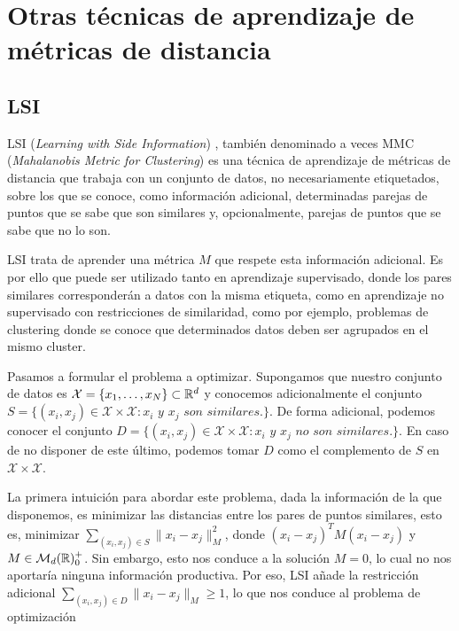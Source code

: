 \section{Otras técnicas de aprendizaje de métricas de distancia}

\subsection{LSI} \label{lsi}

LSI (\emph{Learning with Side Information}) \cite{lsi}, también denominado a veces MMC (\emph{Mahalanobis Metric for Clustering}) es una técnica de aprendizaje de métricas de distancia que trabaja con un conjunto de datos, no necesariamente etiquetados, sobre los que se conoce, como información adicional, determinadas parejas de puntos que se sabe que son similares y, opcionalmente, parejas de puntos que se sabe que no lo son.

LSI trata de aprender una métrica $M$ que respete esta información adicional. Es por ello que puede ser utilizado tanto en aprendizaje supervisado, donde los pares similares corresponderán a datos con la misma etiqueta, como en aprendizaje no supervisado con restricciones de similaridad, como por ejemplo, problemas de clustering donde se conoce que determinados datos deben ser agrupados en el mismo cluster.

Pasamos a formular el problema a optimizar. Supongamos que nuestro conjunto de datos es $\mathcal{X} = \{x_1,\dots,x_N\} \subset \mathbb{R}^d$ y conocemos adicionalmente el conjunto $S = \{(x_i,x_j) \in \mathcal{X}\times\mathcal{X} \colon x_i \textit{ y } x_j \textit{ son similares.}\}$. De forma adicional, podemos conocer el conjunto $D = \{(x_i,x_j) \in \mathcal{X}\times\mathcal{X} \colon x_i \textit{ y } x_j \textit{ no son similares.} \}$. En caso de no disponer de este último, podemos tomar $D$ como el complemento de $S$ en $\mathcal{X} \times \mathcal{X}$.

La primera intuición para abordar este problema, dada la información de la que disponemos, es minimizar las distancias entre los pares de puntos similares, esto es, minimizar $\sum_{(x_i,x_j)\in S} \|x_i - x_j \|_M^2$, donde $(x_i - x_j)^T M (x_i - x_j)$ y $M \in \mathcal{M}_{d}(\mathbb{R})^+_0$. Sin embargo, esto nos conduce a la solución $M = 0$, lo cual no nos aportaría ninguna información productiva. Por eso, LSI añade la restricción adicional $\sum_{(x_i,x_j) \in D} \|x_i - x_j\|_M \ge 1$, lo que nos conduce al problema de optimización

